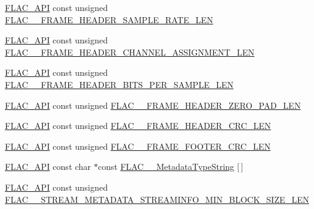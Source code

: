 \begin{DoxyCompactItemize}
\item 
\mbox{\hyperlink{group__flac__export_ga56ca07df8a23310707732b1c0007d6f5}{F\+L\+A\+C\+\_\+\+A\+PI}} const unsigned \mbox{\hyperlink{group__flac__format_gaff504888e04725e4f448ac297c293b76}{F\+L\+A\+C\+\_\+\+\_\+\+F\+R\+A\+M\+E\+\_\+\+H\+E\+A\+D\+E\+R\+\_\+\+S\+A\+M\+P\+L\+E\+\_\+\+R\+A\+T\+E\+\_\+\+L\+EN}}
\item 
\mbox{\hyperlink{group__flac__export_ga56ca07df8a23310707732b1c0007d6f5}{F\+L\+A\+C\+\_\+\+A\+PI}} const unsigned \mbox{\hyperlink{group__flac__format_ga7a0fd74605d24347c4b486d2a62825bd}{F\+L\+A\+C\+\_\+\+\_\+\+F\+R\+A\+M\+E\+\_\+\+H\+E\+A\+D\+E\+R\+\_\+\+C\+H\+A\+N\+N\+E\+L\+\_\+\+A\+S\+S\+I\+G\+N\+M\+E\+N\+T\+\_\+\+L\+EN}}
\item 
\mbox{\hyperlink{group__flac__export_ga56ca07df8a23310707732b1c0007d6f5}{F\+L\+A\+C\+\_\+\+A\+PI}} const unsigned \mbox{\hyperlink{group__flac__format_gae4267632e12c4d6dc514f6bf139865c7}{F\+L\+A\+C\+\_\+\+\_\+\+F\+R\+A\+M\+E\+\_\+\+H\+E\+A\+D\+E\+R\+\_\+\+B\+I\+T\+S\+\_\+\+P\+E\+R\+\_\+\+S\+A\+M\+P\+L\+E\+\_\+\+L\+EN}}
\item 
\mbox{\hyperlink{group__flac__export_ga56ca07df8a23310707732b1c0007d6f5}{F\+L\+A\+C\+\_\+\+A\+PI}} const unsigned \mbox{\hyperlink{group__flac__format_ga11aca6c74654d45939efafcbc3d225bf}{F\+L\+A\+C\+\_\+\+\_\+\+F\+R\+A\+M\+E\+\_\+\+H\+E\+A\+D\+E\+R\+\_\+\+Z\+E\+R\+O\+\_\+\+P\+A\+D\+\_\+\+L\+EN}}
\item 
\mbox{\hyperlink{group__flac__export_ga56ca07df8a23310707732b1c0007d6f5}{F\+L\+A\+C\+\_\+\+A\+PI}} const unsigned \mbox{\hyperlink{group__flac__format_ga85cca90abf67913469818af77256d32d}{F\+L\+A\+C\+\_\+\+\_\+\+F\+R\+A\+M\+E\+\_\+\+H\+E\+A\+D\+E\+R\+\_\+\+C\+R\+C\+\_\+\+L\+EN}}
\item 
\mbox{\hyperlink{group__flac__export_ga56ca07df8a23310707732b1c0007d6f5}{F\+L\+A\+C\+\_\+\+A\+PI}} const unsigned \mbox{\hyperlink{group__flac__format_gad60e31ade8c94bae295828c8c6f74367}{F\+L\+A\+C\+\_\+\+\_\+\+F\+R\+A\+M\+E\+\_\+\+F\+O\+O\+T\+E\+R\+\_\+\+C\+R\+C\+\_\+\+L\+EN}}
\item 
\mbox{\hyperlink{group__flac__export_ga56ca07df8a23310707732b1c0007d6f5}{F\+L\+A\+C\+\_\+\+A\+PI}} const char $\ast$const \mbox{\hyperlink{group__flac__format_gaf1ee427883bf9ecc219c25834e89a0ee}{F\+L\+A\+C\+\_\+\+\_\+\+Metadata\+Type\+String}} \mbox{[}$\,$\mbox{]}
\item 
\mbox{\hyperlink{group__flac__export_ga56ca07df8a23310707732b1c0007d6f5}{F\+L\+A\+C\+\_\+\+A\+PI}} const unsigned \mbox{\hyperlink{group__flac__format_ga196acfb0e7311915ce5528279b717115}{F\+L\+A\+C\+\_\+\+\_\+\+S\+T\+R\+E\+A\+M\+\_\+\+M\+E\+T\+A\+D\+A\+T\+A\+\_\+\+S\+T\+R\+E\+A\+M\+I\+N\+F\+O\+\_\+\+M\+I\+N\+\_\+\+B\+L\+O\+C\+K\+\_\+\+S\+I\+Z\+E\+\_\+\+L\+EN}}

\end{DoxyCompactItemize}
